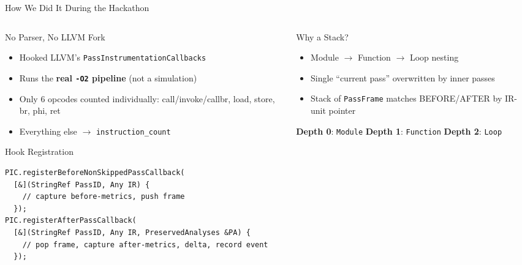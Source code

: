 \documentclass[aspectratio=169]{beamer}
\newcommand{\metric}[2]{\textbf{#1}: \texttt{#2}}
\begin{document}
\begin{frame}[fragile]{How We Did It During the Hackathon}
  \begin{columns}[T,onlytextwidth]
    \begin{column}{0.55\textwidth}
      \begin{alertblock}{No Parser, No LLVM Fork}
        \begin{itemize}
          \item Hooked LLVM's \texttt{PassInstrumentationCallbacks}
          \item Runs the \textbf{real \texttt{-O2} pipeline} (not a simulation)
          \item Only 6 opcodes counted individually: call/invoke/callbr, load, store, br, phi, ret
          \item Everything else $\to$ \texttt{instruction\_count}
        \end{itemize}
      \end{alertblock}
      \begin{block}{Hook Registration}
        \begin{lstlisting}[style=bash]
PIC.registerBeforeNonSkippedPassCallback(
  [&](StringRef PassID, Any IR) {
    // capture before-metrics, push frame
  });
PIC.registerAfterPassCallback(
  [&](StringRef PassID, Any IR, PreservedAnalyses &PA) {
    // pop frame, capture after-metrics, delta, record event
  });
        \end{lstlisting}
      \end{block}
    \end{column}
    \begin{column}{0.4\textwidth}
      \begin{block}{Why a Stack?}
        \begin{itemize}
          \item Module $\to$ Function $\to$ Loop nesting
          \item Single ``current pass'' overwritten by inner passes
          \item Stack of \texttt{PassFrame} matches BEFORE/AFTER by IR-unit pointer
        \end{itemize}
        \vspace{1em}
        \metric{Depth 0}{Module}
        \metric{Depth 1}{Function}
        \metric{Depth 2}{Loop}
      \end{block}
    \end{column}
  \end{columns}
\end{frame}
\end{document}
